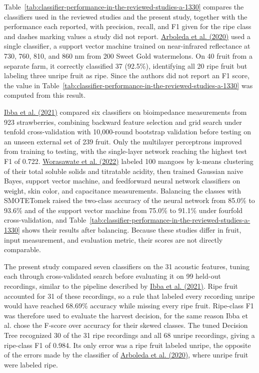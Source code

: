 \begin{thesisprose}
Table~\ref{tab:classifier-performance-in-the-reviewed-studies-a-1330} compares the classifiers used in the reviewed studies and the present study, together with the performance each reported, with precision, recall, and F1 given for the ripe class and dashes marking values a study did not report. \hyperlink{cite.arboleda2020}{Arboleda et al. (2020)} used a single classifier, a support vector machine trained on near-infrared reflectance at 730, 760, 810, and 860 nm from 200 Sweet Gold watermelons. On 40 fruit from a separate farm, it correctly classified 37 (92.5\%), identifying all 20 ripe fruit but labeling three unripe fruit as ripe. Since the authors did not report an F1 score, the value in Table~\ref{tab:classifier-performance-in-the-reviewed-studies-a-1330} was computed from this result.

\hyperlink{cite.ibba2021}{Ibba et al. (2021)} compared six classifiers on bioimpedance measurements from 923 strawberries, combining backward feature selection and grid search under tenfold cross-validation with 10,000-round bootstrap validation before testing on an unseen external set of 239 fruit. Only the multilayer perceptrons improved from training to testing, with the single-layer network reaching the highest test F1 of 0.722. \hyperlink{cite.worasawate2022}{Worasawate et al. (2022)} labeled 100 mangoes by k-means clustering of their total soluble solids and titratable acidity, then trained Gaussian naive Bayes, support vector machine, and feedforward neural network classifiers on weight, skin color, and capacitance measurements. Balancing the classes with SMOTETomek raised the two-class accuracy of the neural network from 85.0\% to 93.6\% and of the support vector machine from 75.0\% to 91.1\% under fourfold cross-validation, and Table~\ref{tab:classifier-performance-in-the-reviewed-studies-a-1330} shows their results after balancing. Because these studies differ in fruit, input measurement, and evaluation metric, their scores are not directly comparable.

The present study compared seven classifiers on the 31 acoustic features, tuning each through cross-validated search before evaluating it on 99 held-out recordings, similar to the pipeline described by \hyperlink{cite.ibba2021}{Ibba et al. (2021)}. Ripe fruit accounted for 31 of these recordings, so a rule that labeled every recording unripe would have reached 68.69\% accuracy while missing every ripe fruit. Ripe-class F1 was therefore used to evaluate the harvest decision, for the same reason Ibba et al. chose the F-score over accuracy for their skewed classes. The tuned Decision Tree recognized 30 of the 31 ripe recordings and all 68 unripe recordings, giving a ripe-class F1 of 0.984. Its only error was a ripe fruit labeled unripe, the opposite of the errors made by the classifier of \hyperlink{cite.arboleda2020}{Arboleda et al. (2020)}, where unripe fruit were labeled ripe.


\end{thesisprose}

